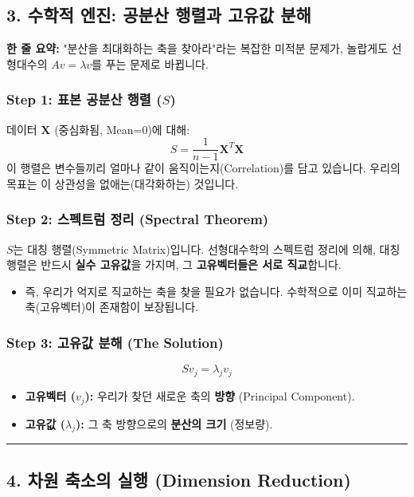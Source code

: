 \documentclass[11pt,a4paper]{book}
\theoremstyle{definition}
\begin{document}
\subsection{3. 수학적 엔진: 공분산 행렬과 고유값 분해}

\begin{conceptbox}[title={개념 3: 모든 것은 고유값 문제로 통한다}]
\textbf{한 줄 요약:} "분산을 최대화하는 축을 찾아라"라는 복잡한 미적분 문제가, 놀랍게도 선형대수의 $Av = \lambda v$를 푸는 문제로 바뀝니다.
\end{conceptbox}

\subsubsection*{Step 1: 표본 공분산 행렬 ($S$)}
데이터 $\mathbf{X}$ (중심화됨, Mean=0)에 대해:
$$ S = \frac{1}{n-1} \mathbf{X}^T \mathbf{X} $$
이 행렬은 변수들끼리 얼마나 같이 움직이는지(Correlation)를 담고 있습니다. 우리의 목표는 이 상관성을 없애는(대각화하는) 것입니다.

\subsubsection*{Step 2: 스펙트럼 정리 (Spectral Theorem)}
$S$는 대칭 행렬(Symmetric Matrix)입니다. 선형대수학의 스펙트럼 정리에 의해, 대칭 행렬은 반드시 \textbf{실수 고유값}을 가지며, 그 \textbf{고유벡터들은 서로 직교}합니다.
\begin{itemize}
    \item 즉, 우리가 억지로 직교하는 축을 찾을 필요가 없습니다. 수학적으로 이미 직교하는 축(고유벡터)이 존재함이 보장됩니다.
\end{itemize}

\subsubsection*{Step 3: 고유값 분해 (The Solution)}
$$ S v_j = \lambda_j v_j $$
\begin{itemize}
    \item \textbf{고유벡터 ($v_j$):} 우리가 찾던 새로운 축의 \textbf{방향} (Principal Component).
    \item \textbf{고유값 ($\lambda_j$):} 그 축 방향으로의 \textbf{분산의 크기} (정보량).
\end{itemize}

\vspace{0.5cm}\hrule\vspace{0.5cm}

\subsection{4. 차원 축소의 실행 (Dimension Reduction)}
\end{document}
